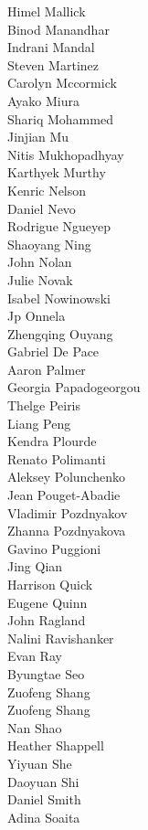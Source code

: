 Himel Mallick\\
Binod Manandhar\\
Indrani Mandal\\
Steven  Martinez\\
Carolyn Mccormick\\
Ayako Miura\\
Shariq Mohammed\\
Jinjian Mu\\
Nitis Mukhopadhyay\\
Karthyek Murthy\\
Kenric Nelson\\
Daniel Nevo\\
Rodrigue Ngueyep\\
Shaoyang Ning\\
John Nolan\\
Julie Novak\\
Isabel Nowinowski\\
Jp Onnela\\
Zhengqing Ouyang\\
Gabriel De Pace\\
Aaron Palmer\\
Georgia Papadogeorgou\\
Thelge Peiris\\
Liang Peng\\
Kendra Plourde\\
Renato Polimanti\\
Aleksey Polunchenko\\
Jean Pouget-Abadie\\
Vladimir Pozdnyakov\\
Zhanna Pozdnyakova\\
Gavino Puggioni\\
Jing Qian\\
Harrison  Quick\\
Eugene Quinn\\
John Ragland\\
Nalini Ravishanker\\
Evan Ray\\
Byungtae Seo\\
Zuofeng Shang\\
Zuofeng Shang\\
Nan Shao\\
Heather Shappell\\
Yiyuan She\\
Daoyuan Shi\\
Daniel Smith\\
Adina Soaita\\
